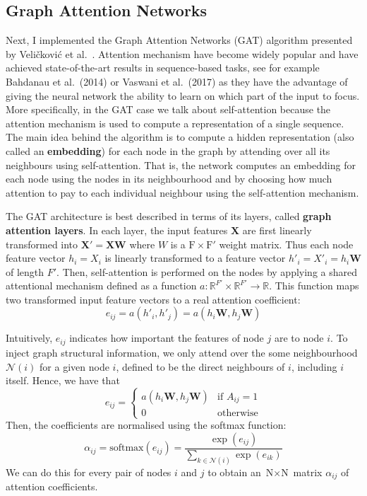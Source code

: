 \documentclass[12pt]{article}
\theoremstyle{definition}
\begin{document}
\subsection{Graph Attention Networks}
Next, I implemented the Graph Attention Networks (GAT) algorithm presented by Veli{\v{c}}kovi{\'{c}} et al.\ \cite{velickovic2018graph}. Attention mechanism have become widely popular and have achieved state-of-the-art results in sequence-based tasks, see for example Bahdanau et al.\ (2014) \cite{bahdanau2014neural} or Vaswani et al.\ (2017) \cite{vaswani2017attention} as they have the advantage of giving the neural network the ability to learn on which part of the input to focus. More specifically, in the GAT case we talk about self-attention because the attention mechanism is used to compute a representation of a single sequence. The main idea behind the algorithm is to compute a hidden representation (also called an \textbf{embedding}) for each node in the graph by attending over all its neighbours using self-attention. That is, the network computes an embedding for each node using the nodes in its neighbourhood and by choosing how much attention to pay to each individual neighbour using the self-attention mechanism.

\bigskip

The GAT architecture is best described in terms of its layers, called \textbf{graph attention layers}. In each layer, the input features $\textbf{X}$ are first linearly transformed into $\textbf{X}' = \textbf{X}\textbf{W}$ where $W$ is a $\textrm{F} \times \textrm{F}'$ weight matrix. Thus each node feature vector $h_i = X_i$ is linearly transformed to a feature vector $h'_i = X'_i = h_i \textbf{W}$ of length $F'$. Then, self-attention is performed on the nodes by applying a shared attentional mechanism defined as a function $a: \mathbb{R}^{F'} \times \mathbb{R}^{F'} \to \mathbb{R}$. This function maps two transformed input feature vectors to a real attention coefficient:
\[
e_{ij} = a(h'_i, h'_j) = a(h_i \textbf{W}, h_j \textbf{W})
\]

Intuitively, $e_{ij}$ indicates how important the features of node $j$ are to node $i$. To inject graph structural information, we only attend over the some neighbourhood $\mathcal{N}(i)$ for a given node $i$, defined to be the direct neighbours of $i$, including $i$ itself. Hence, we have that
\begin{equation*}
e_{ij} = \begin{cases}
				a(h_i \textbf{W}, h_j \textbf{W}) &\text{if $A_{ij} = 1$}\\
				0 &\text{otherwise}
			\end{cases}
\end{equation*}
Then, the coefficients are normalised using the softmax function:
\[
\alpha_{ij} = \textrm{softmax}(e_{ij}) = \frac{\exp(e_{ij})}{\sum_{k \in \mathcal{N}(i)} \exp(e_{ik})}
\]
We can do this for every pair of nodes $i$ and $j$ to obtain an $\textrm{N} \times \textrm{N}$ matrix $\alpha_{ij}$ of attention coefficients.
\end{document}
